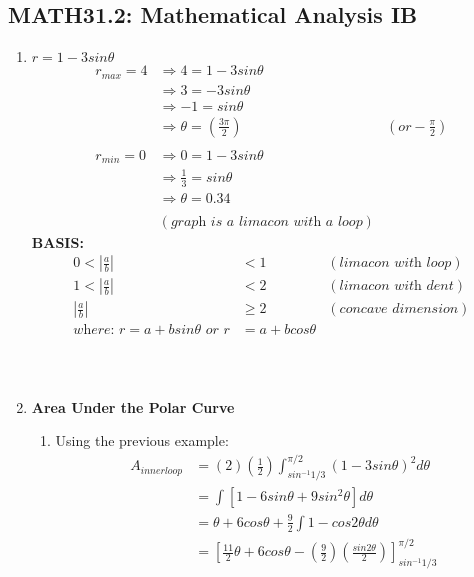 \documentclass{article}
\begin{document}
\subsection*{MATH31.2: Mathematical Analysis IB}
\begin{enumerate}
    \item \textbf{$r=1-3sin\theta$}
    \begin{align*}
        r_{max}=4&\Rightarrow4=1-3sin\theta \\
        &\Rightarrow3=-3sin\theta \\
        &\Rightarrow-1=sin\theta \\
        &\Rightarrow\theta=(\frac{3\pi}{2})&(or-\frac{\pi}{2}) \\
        \\
        r_{min}=0&\Rightarrow0=1-3sin\theta \\
        &\Rightarrow\frac{1}{3}=sin\theta \\
        &\Rightarrow\theta=0.34 \\
        \\
        &(\textit{graph is a limacon with a loop})
    \end{align*}
    \textbf{BASIS:}
    \begin{align*}
        0<|\frac{a}{b}|&<1&(\textit{limacon with loop}) \\
        1<|\frac{a}{b}|&<2&(\textit{limacon with dent}) \\
        |\frac{a}{b}|&\ge2&(\textit{concave dimension}) \\
        \textit{where: } r=a+bsin\theta \textit{ or } r&=a+bcos\theta \\
    \end{align*}
    \\\\
    \item \textbf{Area Under the Polar Curve} \\
    \begin{enumerate}
        \item Using the previous example: \\
        \begin{align*}
            A_{innerloop}&=(2)(\frac{1}{2})\int_{sin^{-1}{1/3}}^{\pi/2} (1-3sin\theta)^2d\theta \\
            &= \int[1-6sin\theta+9sin^2\theta]d\theta \\
            &= \theta + 6cos\theta + \frac{9}{2} \int1-cos2\theta d\theta \\
            &= [ \frac{11}{2}\theta + 6cos\theta - (\frac{9}{2})(\frac{sin2\theta}{2}) ]_{sin^{-1}{1/3}}^{\pi/2}

\end{align*}
\end{enumerate}
\end{enumerate}
\end{document}

